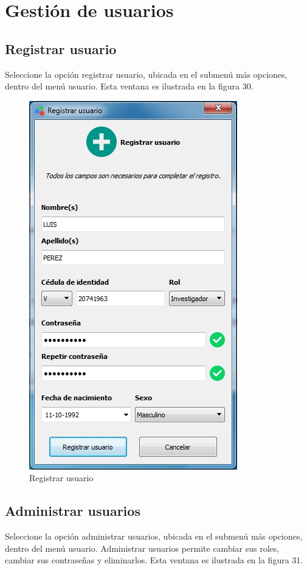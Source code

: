 \newpage

\section{Gesti\'{o}n de usuarios}

	\subsection{Registrar usuario}
	
	Seleccione la opci\'{o}n registrar usuario, ubicada en el submen\'{u} m\'{a}s opciones, dentro del men\'{u} usuario. Esta ventana es ilustrada en la figura 30.
	
\begin{figure}[H]
  \centering
  \includegraphics[width=.6\linewidth]{./img/registrar-usuario.jpg}
\caption{Registrar usuario}
\end{figure}
	
	\subsection{Administrar usuarios}
	
	Seleccione la opci\'{o}n administrar usuarios, ubicada en el submen\'{u} m\'{a}s opciones, dentro del men\'{u} usuario. Administrar usuarios permite cambiar sus roles, cambiar sus contrase\~{n}as y eliminarlos. Esta ventana es ilustrada en la figura 31.
	
